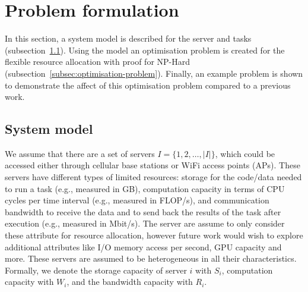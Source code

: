 \section{Problem formulation}\label{sec:problem-formulation}
In this section, a system model is described for the server and tasks (subsection~\ref{subsec:system-model}). Using
the model an optimisation problem is created for the flexible resource allocation with proof for NP-Hard
(subsection~\ref{subsec:optimisation-problem}). Finally, an example problem is shown to demonstrate the affect of this
optimisation problem compared to a previous work.

\subsection{System model}\label{subsec:system-model}

We assume that there are a set of servers $I = \{1,2,\ldots,\left|I\right|\}$, which could be accessed either through
cellular base stations or WiFi access points (APs). These servers have different types of limited resources:
storage for the code/data needed to run a task (e.g., measured in GB), computation capacity in terms of CPU cycles per
time interval (e.g., measured in FLOP/s), and communication bandwidth to receive the data and to send back the results
of the task after execution (e.g., measured in Mbit/s). The server are assume to only consider these attribute for
resource allocation, however future work would wish to explore additional attributes like I/O memory access per second,
GPU capacity and more. These servers are assumed to be heterogeneous in all their characteristics. Formally, we denote
the storage capacity of server $i$ with $S_i$, computation capacity with $W_i$, and the bandwidth capacity with $R_i$.

